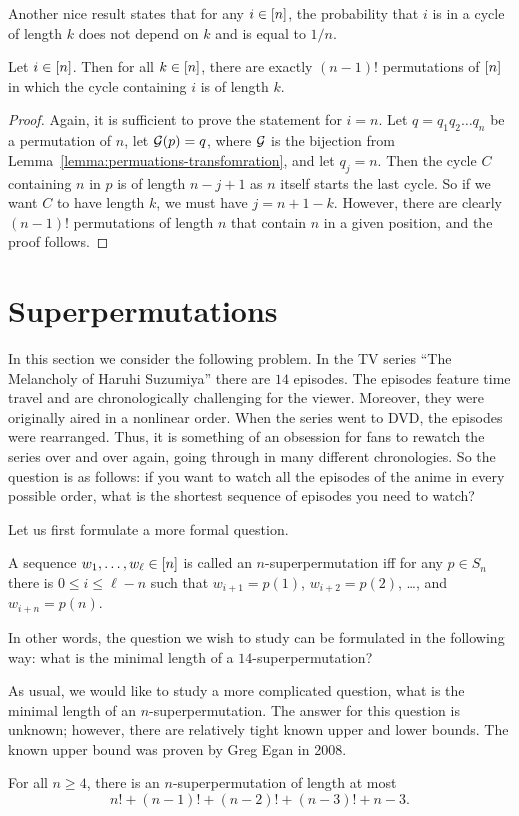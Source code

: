 Another nice result states that for any $i \in {[{n}]}$, the probability that
$i$ is in a cycle of length $k$ does not depend on $k$ and is equal to $1 / n$.
\begin{theorem}
  Let $i \in {[{n}]}$. Then for all $k \in {[{n}]}$, there are exactly $(n - 1)!$
  permutations of ${[{n}]}$ in which the cycle containing $i$ is of length $k$.
\end{theorem}
\begin{proof}
  Again, it is sufficient to prove the statement for $i = n$. Let
  $q = q_1 q_2 \dots q_n$ be a permutation of $n$, let $\mathcal{G}(p) = q$, where
  $\mathcal{G}$ is the bijection from Lemma~\ref{lemma:permuations-transfomration},
  and let  $q_j = n$. Then the cycle $C$ containing $n$ in $p$ is of length
  $n - j + 1$ as $n$ itself starts the last cycle. So if we want $C$ to have
  length $k$, we must have $j = n + 1 - k$. However, there are clearly
  $(n - 1)!$ permutations of length $n$ that contain $n$ in a given position,
  and the proof follows.
\end{proof}

\section{Superpermutations}
In this section we consider the following problem. In the TV series ``The
Melancholy of Haruhi Suzumiya'' there are $14$ episodes. The episodes feature
time travel and are chronologically challenging for the viewer. Moreover,
they were originally aired in a nonlinear order. When the series went to DVD,
the episodes were rearranged. Thus, it is something of an obsession for fans to
rewatch the series over and over again, going through in many different
chronologies. So the question is as follows: if you want to watch all the
episodes of the anime in every possible order, what is the shortest sequence of
episodes you need to watch?

Let us first formulate a more formal question.
\begin{definition}
  A sequence $w_1, \dots, w_\ell \in {[{n}]}$ is called an $n$-superpermutation iff
  for any $p \in S_n$ there is $0 \le i \le \ell - n$ such that
  $w_{i + 1} = p(1)$, $w_{i + 2} = p(2)$, \dots, and $w_{i + n} = p(n)$.
\end{definition}
In other words, the question we wish to study can be formulated in the
following way: what is the minimal length of a $14$-superpermutation?

As usual, we would like to study a more complicated question, what is the
minimal length of an $n$-superpermutation. The answer for this question is
unknown; however, there are relatively tight known upper and lower bounds. The
known upper bound was proven by Greg Egan in 2008.
\begin{theorem}
  For all $n \ge 4$, there is an $n$-superpermutation of length at most
  \[
    n! + (n - 1)! + (n - 2)! + (n - 3)! + n - 3.
  \]
\end{theorem}


